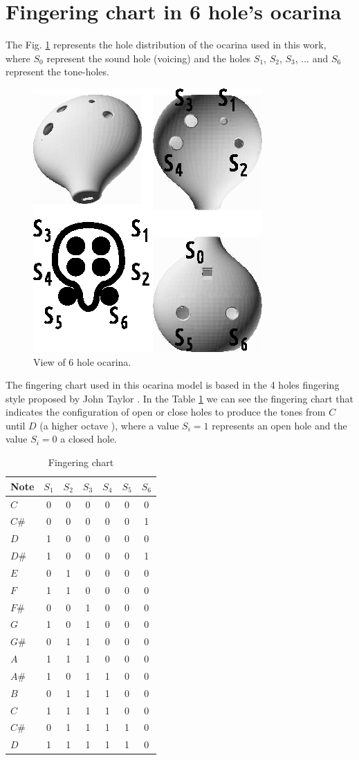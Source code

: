\documentclass{article}
\begin{document}
\section{Fingering chart in  6 hole's ocarina}
The Fig. \ref{fig:ocarinaview} represents the hole distribution of the ocarina
used in this work, where $S_0$ represent the sound hole (voicing)
and the holes $S_1$, $S_2$, $S_3$, ... and $S_6$ represent the tone-holes.
\begin{figure}[ht!]
\centering
\includegraphics[width=0.50\columnwidth]{ocarina-view.eps}
\caption{View of 6 hole ocarina. }
\label{fig:ocarinaview}
\end{figure}
The fingering chart used in this ocarina model is based in the 
4 holes fingering style proposed by John Taylor \cite[pp. 79, 146]{metropolitan1985american}. In the
Table \ref{table:chart} we can see the fingering chart that indicates the configuration of open or close holes
to produce the tones from $C$ until $D$ (a higher octave ), where a value $S_i=1$ represents an
open hole and the value $S_i=0$ a closed hole.
\begin{table}[h!]
\center
\begin{tabular}{l|c|c|c|c|c|c}
Note & $S_1$ & $S_2$ & $S_3$ & $S_4$ & $S_5$ & $S_6$ \\ \hline
\hline 
$C$  & 0 & 0 & 0 & 0 & 0 & 0 \\
$C\#$& 0 & 0 & 0 & 0 & 0 & 1 \\
$D$  & 1 & 0 & 0 & 0 & 0 & 0 \\
$D\#$& 1 & 0 & 0 & 0 & 0 & 1 \\
$E$  & 0 & 1 & 0 & 0 & 0 & 0 \\
$F$  & 1 & 1 & 0 & 0 & 0 & 0 \\
$F\#$& 0 & 0 & 1 & 0 & 0 & 0 \\
$G$  & 1 & 0 & 1 & 0 & 0 & 0 \\
$G\#$& 0 & 1 & 1 & 0 & 0 & 0 \\
$A$  & 1 & 1 & 1 & 0 & 0 & 0 \\
$A\#$& 1 & 0 & 1 & 1 & 0 & 0 \\
$B$  & 0 & 1 & 1 & 1 & 0 & 0 \\
$C$& 1 & 1 & 1 & 1 & 0 & 0 \\
$C\#$& 0 & 1 & 1 & 1 & 1 & 0 \\
$D$& 1 & 1 & 1 & 1 & 1 & 0 \\ 
\hline 
\end{tabular}
\vspace{5pt}
\caption{Fingering chart}
\label{table:chart}
\end{table}
\end{document}
